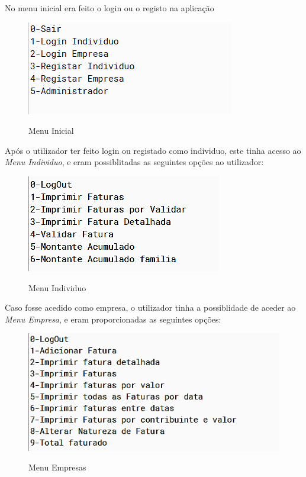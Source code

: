 \documentclass[10pt, a4paper]{report}
\begin{document}
No menu inicial era feito o login ou o registo na aplicação

\begin{figure}[h]
\caption{Menu Inicial}
\centering
\includegraphics{Menu}
\label{menu0}
\end{figure}

Após o utilizador ter feito login ou registado como individuo, este tinha acesso ao \emph{Menu Individuo}, e eram possiblitadas as seguintes opções ao utilizador:

\begin{figure}[h]
\caption{Menu Individuo}
\centering
\includegraphics{Individuo}
\label{menu1}
\end{figure}

Caso fosse acedido como empresa, o utilizador tinha a possiblidade de aceder ao \emph{Menu Empresa}, e eram proporcionadas as seguintes opções:

\begin{figure}[h]
\caption{Menu Empresas}
\centering
\includegraphics{Empresas}
\label{menu2}
\end{figure}
\end{document}
